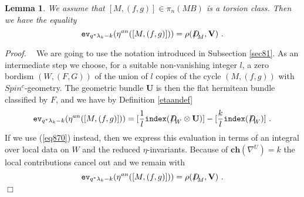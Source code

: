 \documentclass[12pt]{article}
\newtheorem{lem}[theorem]{Lemma}
\newcommand{\ev}{{\tt ev}}
\def\hB{\hspace*{\fill}$\Box$ \newline\noindent}
\newcommand{\proof}{{\it Proof.$\:\:\:\:$}}
\newcommand{\ch}{{\mathbf{ch}}}
\newcommand{\bV}{{\mathbf{V}}}
\newcommand{\bU}{{\mathbf{U}}}
\newcommand{\Dirac}{{D\hspace{-0.27cm}/}}
\newcommand{\ind}{{\tt index}}
\begin{document}
\begin{lem} 
We assume that $[M,(f,g)]\in \pi_{n}(MB)$ is a torsion class. Then we have the equality
  \begin{equation}\label{rihsqw}\ev_{q^{*}\lambda_{k}-k}(\eta^{an}([M,(f,g)])) =\rho(\Dirac_{M},\bV)\ .\end{equation}
   \end{lem}
   \proof
    We are going to use the notation introduced in Subsection \ref{sec81}. As an intermediate step we choose, for a suitable non-vanishing integer $l$,  a zero bordism $(W,(F,G))$ of the union of $l$  copies of the cycle $(M,(f,g))$ with $Spin^{c}$-geometry. The geometric bundle $\bU$ is then the flat hermitean bundle classified by $F$, and we have by Definition \ref{etaandef}
$$\ev_{q^{*}\lambda_{k}-k}(\eta^{an}([M,(f,g)]))=[\frac{1}{l}\ind(\Dirac_{W}\otimes \bU)]-[\frac{k}{l}\ind(\Dirac_{W})]\ .$$ If we use (\ref{eq870}) instead, then we express this evaluation
in terms of an integral over local data on $W$ and the reduced $\eta$-invariants. Because of $\ch(\nabla^{U})=k$
the local contributions cancel out and we remain with
$$\ev_{q^{*}\lambda_{k}-k}(\eta^{an}([M,(f,g)]))=\rho(\Dirac_{M},\bV)\ .$$
\hB 
\end{document}
